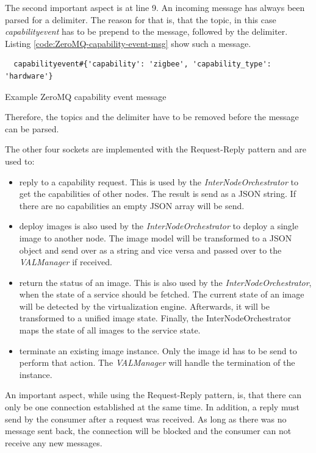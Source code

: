 The second important aspect is at line 9.
An incoming message has always been parsed for a delimiter.
The reason for that is, that the topic, in this case \textit{capabilityevent} has to be prepend to the message, followed by the delimiter.
Listing \ref{code:ZeroMQ-capability-event-msg} show such a message.
\begin{listing}[H]
  \begin{verbatim}
  capabilityevent#{'capability': 'zigbee', 'capability_type': 'hardware'}
  \end{verbatim}
  \caption{Example ZeroMQ capability event message}
  \label{code:ZeroMQ-capability-event-msg}
\end{listing}
Therefore, the topics and the delimiter have to be removed before the message can be parsed.\newline

The other four sockets are implemented with the Request-Reply pattern and are used to:\newline
\begin{itemize}
  \item reply to a capability request.
  This is used by the \textit{InterNodeOrchestrator} to get the capabilities of other nodes.
  The result is send as a \ac{JSON} string.
  If there are no capabilities an empty \ac{JSON} array will be send.
  \item deploy images is also used by the \textit{InterNodeOrchestrator} to deploy a single image to another node.
  The image model will be transformed to a \ac{JSON} object and send over as a string and vice versa and passed over to the \textit{VALManager} if received.
  \item return the status of an image.
  This is also used by the \textit{InterNodeOrchestrator}, when the state of a service should be fetched.
  The current state of an image will be detected by the virtualization engine.
  Afterwards, it will be transformed to a unified image state.
  Finally, the InterNodeOrchestrator maps the state of all images to the service state.
  \item terminate an existing image instance.
  Only the image id has to be send to perform that action.
  The \textit{VALManager} will handle the termination of the instance.
\end{itemize}
\bigskip

An important aspect, while using the Request-Reply pattern, is, that there can only be one connection established at the same time.
In addition, a reply must send by the consumer after a request was received.
As long as there was no message sent back, the connection will be blocked and the consumer can not receive any new messages.\newline

